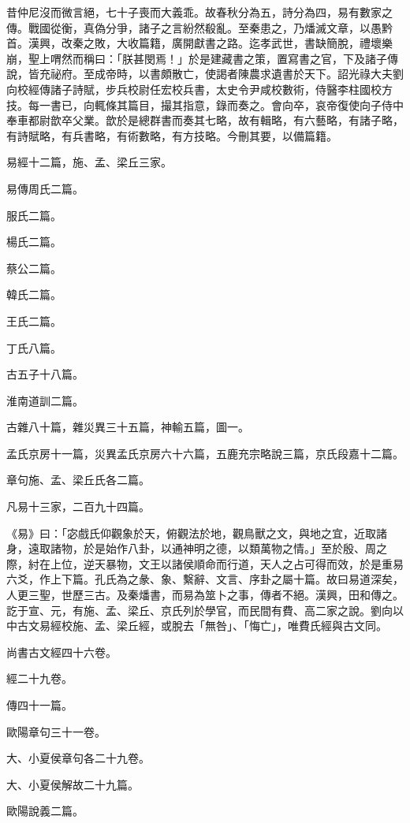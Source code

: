 
\begin{pinyinscope}
昔仲尼沒而微言絕，七十子喪而大義乖。故春秋分為五，詩分為四，易有數家之傳。戰國從衡，真偽分爭，諸子之言紛然殽亂。至秦患之，乃燔滅文章，以愚黔首。漢興，改秦之敗，大收篇籍，廣開獻書之路。迄孝武世，書缺簡脫，禮壞樂崩，聖上喟然而稱曰：「朕甚閔焉！」於是建藏書之策，置寫書之官，下及諸子傳說，皆充祕府。至成帝時，以書頗散亡，使謁者陳農求遺書於天下。詔光祿大夫劉向校經傳諸子詩賦，步兵校尉任宏校兵書，太史令尹咸校數術，侍醫李柱國校方技。每一書已，向輒條其篇目，撮其指意，錄而奏之。會向卒，哀帝復使向子侍中奉車都尉歆卒父業。歆於是總群書而奏其七略，故有輯略，有六藝略，有諸子略，有詩賦略，有兵書略，有術數略，有方技略。今刪其要，以備篇籍。

易經十二篇，施、孟、梁丘三家。

易傳周氏二篇。

服氏二篇。

楊氏二篇。

蔡公二篇。

韓氏二篇。

王氏二篇。

丁氏八篇。

古五子十八篇。

淮南道訓二篇。

古雜八十篇，雜災異三十五篇，神輸五篇，圖一。

孟氏京房十一篇，災異孟氏京房六十六篇，五鹿充宗略說三篇，京氏段嘉十二篇。

章句施、孟、梁丘氏各二篇。

凡易十三家，二百九十四篇。

《易》曰：「宓戲氏仰觀象於天，俯觀法於地，觀鳥獸之文，與地之宜，近取諸身，遠取諸物，於是始作八卦，以通神明之德，以類萬物之情。」至於殷、周之際，紂在上位，逆天暴物，文王以諸侯順命而行道，天人之占可得而效，於是重易六爻，作上下篇。孔氏為之彖、象、繫辭、文言、序卦之屬十篇。故曰易道深矣，人更三聖，世歷三古。及秦燔書，而易為筮卜之事，傳者不絕。漢興，田和傳之。訖于宣、元，有施、孟、梁丘、京氏列於學官，而民間有費、高二家之說。劉向以中古文易經校施、孟、梁丘經，或脫去「無咎」、「悔亡」，唯費氏經與古文同。

尚書古文經四十六卷。

經二十九卷。

傳四十一篇。

歐陽章句三十一卷。

大、小夏侯章句各二十九卷。

大、小夏侯解故二十九篇。

歐陽說義二篇。


\end{pinyinscope}
